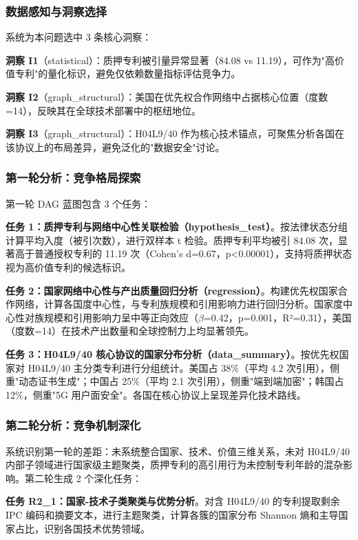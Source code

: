 \subsubsection{数据感知与洞察选择}

系统为本问题选中 3 条核心洞察：

\textbf{洞察 I1}（statistical）：质押专利被引量异常显著（84.08 vs 11.19），可作为"高价值专利"的量化标识，避免仅依赖数量指标评估竞争力。

\textbf{洞察 I2}（graph\_structural）：美国在优先权合作网络中占据核心位置（度数=14），反映其在全球技术部署中的枢纽地位。

\textbf{洞察 I3}（graph\_structural）：H04L9/40 作为核心技术锚点，可聚焦分析各国在该协议上的布局差异，避免泛化的"数据安全"讨论。

\subsubsection{第一轮分析：竞争格局探索}

第一轮 DAG 蓝图包含 3 个任务：

\textbf{任务 1：质押专利与网络中心性关联检验（hypothesis\_test）}。按法律状态分组计算平均入度（被引次数），进行双样本 t 检验。质押专利平均被引 84.08 次，显著高于普通授权专利的 11.19 次（Cohen's d=0.67，p<0.00001），支持将质押状态视为高价值专利的候选标识。

\textbf{任务 2：国家网络中心性与产出质量回归分析（regression）}。构建优先权国家合作网络，计算各国度中心性，与专利族规模和引用影响力进行回归分析。国家度中心性对族规模和引用影响力呈中等正向效应（$\beta$=0.42，p=0.001，R²=0.31），美国（度数=14）在技术产出数量和全球控制力上均显著领先。

\textbf{任务 3：H04L9/40 核心协议的国家分布分析（data\_summary）}。按优先权国家对 H04L9/40 主分类专利进行分组统计。美国占 38\%（平均 4.2 次引用），侧重"动态证书生成"；中国占 25\%（平均 2.1 次引用），侧重"端到端加密"；韩国占 12\%，侧重"5G 用户面安全"。各国在核心协议上呈现差异化技术路线。

\subsubsection{第二轮分析：竞争机制深化}

系统识别第一轮的差距：未系统整合国家、技术、价值三维关系，未对 H04L9/40 内部子领域进行国家级主题聚类，质押专利的高引用行为未控制专利年龄的混杂影响。第二轮生成 2 个深化任务：

\textbf{任务 R2\_1：国家-技术子类聚类与优势分析}。对含 H04L9/40 的专利提取剩余 IPC 编码和摘要文本，进行主题聚类，计算各簇的国家分布 Shannon 熵和主导国家占比，识别各国技术优势领域。

